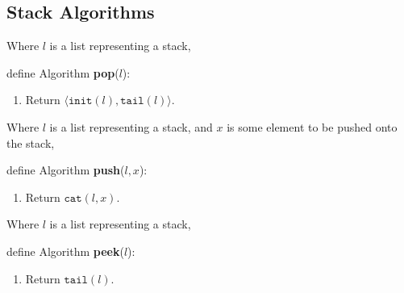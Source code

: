 
\subsection{Stack Algorithms}


 \begin{framed}
  Where $l$ is a list representing a stack, 

  \vspace{12pt}
  define Algorithm \textbf{pop}($l$):
 
  \begin{enumerate}
   \item Return $\langle \texttt{init}(l), \texttt{tail}(l) \rangle$.
  \end{enumerate}
 \end{framed}

 \begin{framed}
  Where $l$ is a list representing a stack, and $x$ is some element to be pushed
  onto the stack, 

  \vspace{12pt}
  define Algorithm \textbf{push}($l, x$):
 
  \begin{enumerate}
   \item Return $\texttt{cat}(l, x)$.
  \end{enumerate}
 \end{framed}

 \begin{framed}
  Where $l$ is a list representing a stack,

  \vspace{12pt}
  define Algorithm \textbf{peek}($l$):
 
  \begin{enumerate}
   \item Return $\texttt{tail}(l)$.
  \end{enumerate}
 \end{framed}

